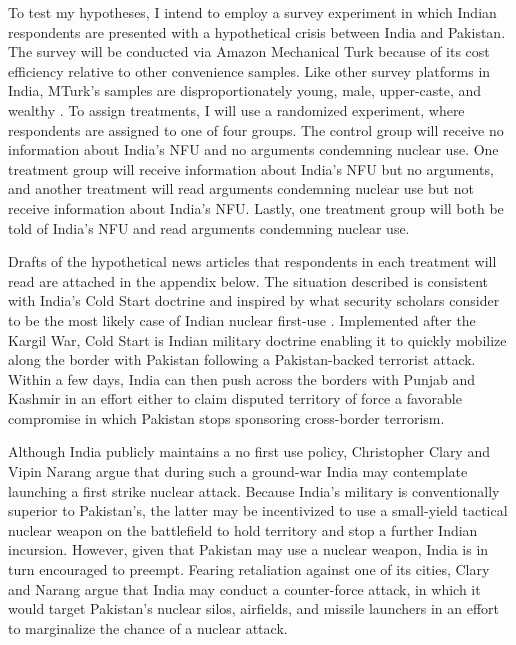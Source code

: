 \documentclass[12pt]{article}
\begin{document}
To test my hypotheses, I intend to employ a survey experiment in which Indian respondents are presented with a hypothetical crisis between India and Pakistan. The survey will be conducted via Amazon Mechanical Turk because of its cost efficiency relative to other convenience samples. Like other survey platforms in India, MTurk's samples are disproportionately young, male, upper-caste, and wealthy \citep{boas_recruiting_2020}. To assign treatments, I will use a randomized experiment, where respondents are assigned to one of four groups. The control group will receive no information about India's NFU and no arguments condemning nuclear use. One treatment group will receive information about India's NFU but no arguments, and another treatment will read arguments condemning nuclear use but not receive information about India's NFU. Lastly, one treatment group will both be told of India's NFU and read arguments condemning nuclear use.

Drafts of the hypothetical news articles that respondents in each treatment will read are attached in the appendix below. The situation described is consistent with India's Cold Start doctrine and inspired by what security scholars consider to be the most likely case of Indian nuclear first-use \citep{kapur_ten_2008, clary_indias_2019}. Implemented after the Kargil War, Cold Start is Indian military doctrine enabling it to quickly mobilize along the border with Pakistan following a Pakistan-backed terrorist attack. Within a few days, India can then push across the borders with Punjab and Kashmir in an effort either to claim disputed territory of force a favorable compromise in which Pakistan stops sponsoring cross-border terrorism. 

Although India publicly maintains a no first use policy, Christopher Clary and Vipin Narang argue that during such a ground-war India may contemplate launching a first strike nuclear attack. Because India's military is conventionally superior to Pakistan's, the latter may be incentivized to use a small-yield tactical nuclear weapon on the battlefield to hold territory and stop a further Indian incursion. However, given that Pakistan may use a nuclear weapon, India is in turn encouraged to preempt. Fearing retaliation against one of its cities, Clary and Narang argue that India may conduct a counter-force attack, in which it would target Pakistan's nuclear silos, airfields, and missile launchers in an effort to marginalize the chance of a nuclear attack. 
\end{document}
